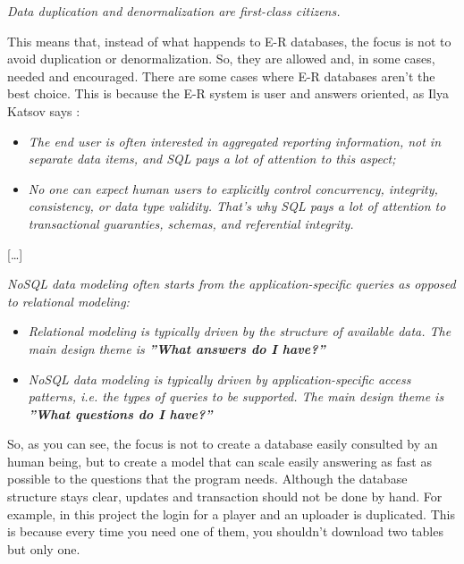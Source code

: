 \begin{center}
	\textit{Data duplication and denormalization are first-class citizens.}\cite{website:nosqldatamodeling}
\end{center}

This means that, instead of what happends to E-R databases, the focus is not to avoid duplication or denormalization. So, they are allowed and, in some cases, needed and encouraged. There are some cases where E-R databases aren't the best choice. This is because the E-R system is user and answers oriented, as Ilya Katsov says \cite{website:nosqldatamodeling}:

\begin{itemize}
\item \textit{The end user is often interested in aggregated reporting information, not in separate data items, and SQL pays a lot of attention to this aspect;}
\item \textit{No one can expect human users to explicitly control concurrency, integrity, consistency, or data type validity. That’s why SQL pays a lot of attention to transactional guaranties, schemas, and referential integrity.}
\end{itemize}

\begin{center}
[\dots\unkern]
\end{center}

\textit{NoSQL data modeling often starts from the application-specific queries as opposed to relational modeling:}
\begin{itemize}
\item \textit{Relational modeling is typically driven by the structure of available data. The main design theme is  \textbf{”What answers do I have?”}}
\item \textit{NoSQL data modeling is typically driven by application-specific access patterns, i.e. the types of queries to be supported. The main design theme is \textbf{”What questions do I have?”}}
\end{itemize}

So, as you can see, the focus is not to create a database easily consulted by an human being, but to create a model that can scale easily answering as fast as possible to the questions that the program needs. Although the database structure stays clear, updates and transaction should not be done by hand. For example, in this project the login for a player and an uploader is duplicated. This is because every time you need one of them, you shouldn't download two tables but only one.

